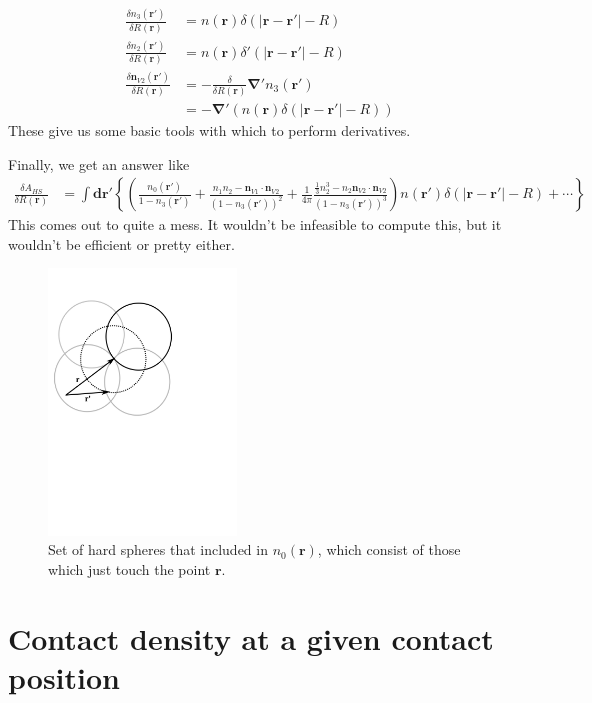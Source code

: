 \documentclass[letterpaper,twocolumn,amsmath,amssymb,prb]{revtex4-1}
\begin{document}
\begin{widetext}
\begin{align}
  \frac{\delta n_3(\mathbf{r}')}{\delta R(\mathbf{r})} &=
  n(\mathbf{r})\delta(|\mathbf{r}-\mathbf{r}'| - R) \\
  \frac{\delta n_2(\mathbf{r}')}{\delta R(\mathbf{r})} &=
  n(\mathbf{r}) \delta'(|\mathbf{r}-\mathbf{r}'| - R) \\
  \frac{\delta \mathbf{n}_{V2}(\mathbf{r}')}{\delta R(\mathbf{r})} &=
  -\frac{\delta}{\delta R(\mathbf{r})} \mathbf{\nabla}' n_3(\mathbf{r}')
  \\
  &= -\mathbf{\nabla}'
  \left(n(\mathbf{r})\delta(|\mathbf{r}-\mathbf{r}'| - R) \right)
\end{align}
These give us some basic tools with which to perform derivatives.

Finally, we get an answer like
\begin{align}
  \frac{\delta A_{HS}}{\delta R(\mathbf{r})} &=
  \int \mathbf{dr}' \left\{
  \left(
  \frac{n_0(\mathbf{r}')}{1 - n_3(\mathbf{r}')}
  + \frac{n_1n_2 - \mathbf{n}_{V1}\cdot\mathbf{n}_{V2}}{(1 -
    n_3(\mathbf{r}'))^2}
  + \frac{1}{4\pi}\frac{
    \frac13 n_2^3 - n_2 \mathbf{n}_{V2} \cdot \mathbf{n}_{V2}
  }{
    (1-n_3(\mathbf{r}'))^3
  }
  \right) n(\mathbf{r}') \delta(|\mathbf{r}-\mathbf{r}'| - R)
  + \cdots
  \right\}
\end{align}
This comes out to quite a mess.  It wouldn't be infeasible to compute
this, but it wouldn't be efficient or pretty either.

\begin{figure}
\includegraphics[width=5cm]{figs/n0}
\caption{Set of hard spheres that included in $n_0(\mathbf{r})$, which
  consist of those which just touch the point $\mathbf{r}$.}
\label{fig:n0}
\end{figure}

\section{Contact density at a given contact position}


\end{widetext}
\end{document}
